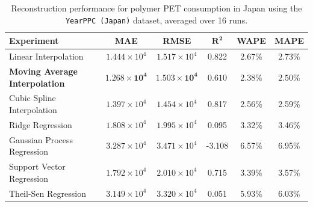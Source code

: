 \begin{table}[!ht]
	\centering
	\caption{\centering Reconstruction performance for polymer PET consumption in Japan using the \texttt{YearPPC (Japan)} dataset, averaged over 16 runs.}
	\begin{tabular}{@{}lccccc@{}}
		\toprule
		\textbf{Experiment}         & \textbf{MAE}                   & \textbf{RMSE}         & $\mathbf{R^2}$ & \textbf{WAPE} & \textbf{MAPE} \\
		\midrule
		Linear Interpolation        & \(1.444 \times 10^4\)          & \(1.517 \times 10^4\) & 0.822          & 2.67\%        & 2.73\%        \\
		\textbf{Moving Average Interpolation}
		                            & \(\mathbf{1.268 \times 10^4}\)
		                            & \(\mathbf{1.503 \times 10^4}\)
		                            & \(\mathbf{0.610}\)
		                            & \(\mathbf{2.38}\)\%
		                            & \(\mathbf{2.50}\)\%                                                                                     \\
		Cubic Spline Interpolation  & \(1.397 \times 10^4\)          & \(1.454 \times 10^4\) & 0.817          & 2.56\%        & 2.59\%        \\
		Ridge Regression            & \(1.808 \times 10^4\)          & \(1.995 \times 10^4\) & 0.095          & 3.32\%        & 3.46\%        \\
		Gaussian Process Regression & \(3.287 \times 10^4\)          & \(3.471 \times 10^4\) & -3.108         & 6.57\%        & 6.95\%        \\
		Support Vector Regression   & \(1.792 \times 10^4\)          & \(2.010 \times 10^4\) & 0.715          & 3.39\%        & 3.57\%        \\
		Theil-Sen Regression        & \(3.149 \times 10^4\)          & \(3.320 \times 10^4\) & 0.051          & 5.93\%        & 6.03\%        \\
		\hline
	\end{tabular}
	\label{tab:reconstruction_japan}
\end{table}

